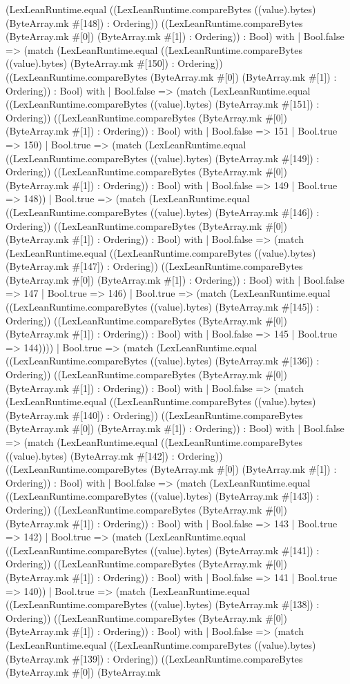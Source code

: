 \documentclass[11pt]{article}
\begin{document}
(LexLeanRuntime.equal ((LexLeanRuntime.compareBytes ((value).bytes) (ByteArray.mk \#[148]) : Ordering)) ((LexLeanRuntime.compareBytes (ByteArray.mk \#[0]) (ByteArray.mk \#[1]) : Ordering)) : Bool) with | Bool.false => (match (LexLeanRuntime.equal ((LexLeanRuntime.compareBytes ((value).bytes) (ByteArray.mk \#[150]) : Ordering)) ((LexLeanRuntime.compareBytes (ByteArray.mk \#[0]) (ByteArray.mk \#[1]) : Ordering)) : Bool) with | Bool.false => (match (LexLeanRuntime.equal ((LexLeanRuntime.compareBytes ((value).bytes) (ByteArray.mk \#[151]) : Ordering)) ((LexLeanRuntime.compareBytes (ByteArray.mk \#[0]) (ByteArray.mk \#[1]) : Ordering)) : Bool) with | Bool.false => 151 | Bool.true => 150) | Bool.true => (match (LexLeanRuntime.equal ((LexLeanRuntime.compareBytes ((value).bytes) (ByteArray.mk \#[149]) : Ordering)) ((LexLeanRuntime.compareBytes (ByteArray.mk \#[0]) (ByteArray.mk \#[1]) : Ordering)) : Bool) with | Bool.false => 149 | Bool.true => 148)) | Bool.true => (match (LexLeanRuntime.equal ((LexLeanRuntime.compareBytes ((value).bytes) (ByteArray.mk \#[146]) : Ordering)) ((LexLeanRuntime.compareBytes (ByteArray.mk \#[0]) (ByteArray.mk \#[1]) : Ordering)) : Bool) with | Bool.false => (match (LexLeanRuntime.equal ((LexLeanRuntime.compareBytes ((value).bytes) (ByteArray.mk \#[147]) : Ordering)) ((LexLeanRuntime.compareBytes (ByteArray.mk \#[0]) (ByteArray.mk \#[1]) : Ordering)) : Bool) with | Bool.false => 147 | Bool.true => 146) | Bool.true => (match (LexLeanRuntime.equal ((LexLeanRuntime.compareBytes ((value).bytes) (ByteArray.mk \#[145]) : Ordering)) ((LexLeanRuntime.compareBytes (ByteArray.mk \#[0]) (ByteArray.mk \#[1]) : Ordering)) : Bool) with | Bool.false => 145 | Bool.true => 144)))) | Bool.true => (match (LexLeanRuntime.equal ((LexLeanRuntime.compareBytes ((value).bytes) (ByteArray.mk \#[136]) : Ordering)) ((LexLeanRuntime.compareBytes (ByteArray.mk \#[0]) (ByteArray.mk \#[1]) : Ordering)) : Bool) with | Bool.false => (match (LexLeanRuntime.equal ((LexLeanRuntime.compareBytes ((value).bytes) (ByteArray.mk \#[140]) : Ordering)) ((LexLeanRuntime.compareBytes (ByteArray.mk \#[0]) (ByteArray.mk \#[1]) : Ordering)) : Bool) with | Bool.false => (match (LexLeanRuntime.equal ((LexLeanRuntime.compareBytes ((value).bytes) (ByteArray.mk \#[142]) : Ordering)) ((LexLeanRuntime.compareBytes (ByteArray.mk \#[0]) (ByteArray.mk \#[1]) : Ordering)) : Bool) with | Bool.false => (match (LexLeanRuntime.equal ((LexLeanRuntime.compareBytes ((value).bytes) (ByteArray.mk \#[143]) : Ordering)) ((LexLeanRuntime.compareBytes (ByteArray.mk \#[0]) (ByteArray.mk \#[1]) : Ordering)) : Bool) with | Bool.false => 143 | Bool.true => 142) | Bool.true => (match (LexLeanRuntime.equal ((LexLeanRuntime.compareBytes ((value).bytes) (ByteArray.mk \#[141]) : Ordering)) ((LexLeanRuntime.compareBytes (ByteArray.mk \#[0]) (ByteArray.mk \#[1]) : Ordering)) : Bool) with | Bool.false => 141 | Bool.true => 140)) | Bool.true => (match (LexLeanRuntime.equal ((LexLeanRuntime.compareBytes ((value).bytes) (ByteArray.mk \#[138]) : Ordering)) ((LexLeanRuntime.compareBytes (ByteArray.mk \#[0]) (ByteArray.mk \#[1]) : Ordering)) : Bool) with | Bool.false => (match (LexLeanRuntime.equal ((LexLeanRuntime.compareBytes ((value).bytes) (ByteArray.mk \#[139]) : Ordering)) ((LexLeanRuntime.compareBytes (ByteArray.mk \#[0]) (ByteArray.mk 
\end{document}
